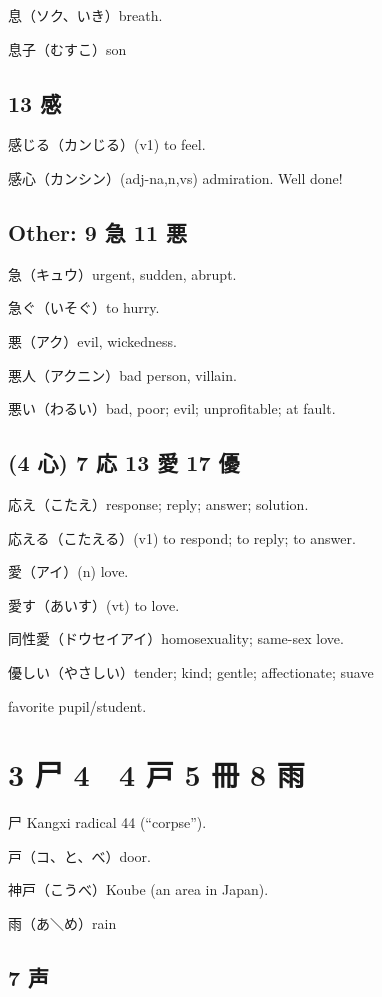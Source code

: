 息（ソク、いき）breath.

息子（むすこ）son

\subsection{13 感}

感じる（カンじる）(v1) to feel.

感心（カンシン）(adj-na,n,vs) admiration. Well done!

\subsection{Other: 9 急 11 悪}

急（キュウ）urgent, sudden, abrupt.

急ぐ（いそぐ）to hurry.

悪（アク）evil, wickedness.

悪人（アクニン）bad person, villain.

悪い（わるい）bad, poor; evil; unprofitable; at fault.

\subsection{(4 心) 7 応 13 愛 17 優}

応え（こたえ）response; reply; answer; solution.

応える（こたえる）(v1) to respond; to reply; to answer.

愛（アイ）(n) love.

愛す（あいす）(vt) to love.

同性愛（ドウセイアイ）homosexuality; same-sex love.

優しい（やさしい）tender; kind; gentle; affectionate; suave

favorite pupil/student.

\section{3 尸 4 𠃜 4 戸 5 冊 8 雨}

尸 Kangxi radical 44 (``corpse'').

戸（コ、と、べ）door.

神戸（こうべ）Koube (an area in Japan).

雨（あ＼め）rain

\subsection{7 声}

